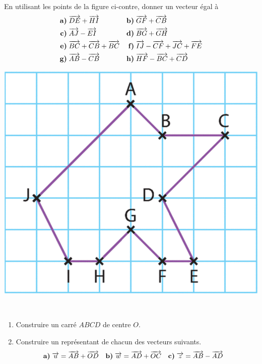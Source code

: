\documentclass[11pt]{article}
\begin{document}
\begin{exo}~\\[-4mm]
  \begin{minipage}[]{.5\textwidth}
    En utilisant les points de la figure ci-contre, donner un vecteur égal à
    \begin{align*}
      \textbf{a)}\;& \vect{DE}+\vect{HI} &
      \textbf{b)}\;& \vect{GF}+\vect{CB} \\
      \textbf{c)}\;& \vect{AJ}-\vect{EI} &
      \textbf{d)}\;& \vect{BG}+\vect{GH} \\
      \textbf{e)}\;& \vect{BC}+\vect{CB}+\vect{BC} &
      \textbf{f)}\;& \vect{IJ}-\vect{CF}+\vect{JC}+\vect{FE} \\
      \textbf{g)}\;& \vect{AB}-\vect{CB} &
      \textbf{h)}\;& \vect{HF}-\vect{BC}+\vect{CD} %
    \end{align*}
  \end{minipage}
  \begin{minipage}[]{.5\textwidth}
    \begin{center}
      \includegraphics[scale=.2]{polygone.png}
    \end{center}
  \end{minipage}
\end{exo}

\begin{exo}~\\[-3mm]
  \begin{enumerate}
    \item Construire un carré $ABCD$ de centre $O$.
    \item Construire un représentant de chacun des vecteurs suivants.
      \begin{align*}
        \textbf{a)}\;& \overrightarrow{u} = \overrightarrow{AB}+\overrightarrow{OD} &
        \textbf{b)}\;& \overrightarrow{w} = \overrightarrow{AD}+\overrightarrow{OC} &
        \textbf{c)}\;& \overrightarrow{z} = \overrightarrow{AB}-\overrightarrow{AD}
      \end{align*}
  \end{enumerate}
\end{exo}
\end{document}
